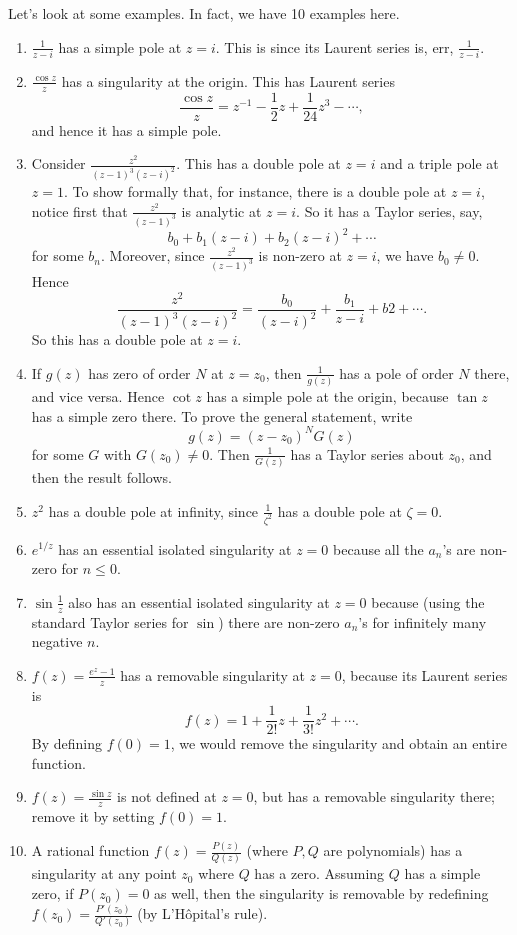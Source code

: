 \documentclass[a4paper]{article}
\begin{document}
Let's look at some examples. In fact, we have 10 examples here.
\begin{eg}\leavevmode
  \begin{enumerate}
    \item $\frac{1}{z - i}$ has a simple pole at $z = i$. This is since its Laurent series is, err, $\frac{1}{z - i}$.
    \item $\frac{\cos z}{z}$ has a singularity at the origin. This has Laurent series
      \[
        \frac{\cos z}{z} = z^{-1} - \frac{1}{2}z + \frac{1}{24}z^3 - \cdots,
      \]
      and hence it has a simple pole.
    \item Consider $\frac{z^2}{(z - 1)^3(z - i)^2}$. This has a double pole at $z = i$ and a triple pole at $z = 1$. To show formally that, for instance, there is a double pole at $z = i$, notice first that $\frac{z^2}{(z - 1)^3}$ is analytic at $z = i$. So it has a Taylor series, say,
      \[
        b_0 + b_1(z - i) + b_2(z - i)^2 + \cdots
      \]
      for some $b_n$. Moreover, since $\frac{z^2}{(z - 1)^3}$ is non-zero at $z = i$, we have $b_0 \not= 0$. Hence
      \[
        \frac{z^2}{(z - 1)^3 (z - i)^2} = \frac{b_0}{(z - i)^2} + \frac{b_1}{z - i} + b2 + \cdots.
      \]
      So this has a double pole at $z = i$.
    \item If $g(z)$ has zero of order $N$ at $z = z_0$, then $\frac{1}{g(z)}$ has a pole of order $N$ there, and vice versa. Hence $\cot z$ has a simple pole at the origin, because $\tan z$ has a simple zero there. To prove the general statement, write
      \[
        g(z) = (z - z_0)^N G(z)
      \]
      for some $G$ with $G(z_0) \not= 0$. Then $\frac{1}{G(z)}$ has a Taylor series about $z_0$, and then the result follows.
    \item $z^2$ has a double pole at infinity, since $\frac{1}{\zeta^2}$ has a double pole at $\zeta = 0$.
    \item $e^{1/z}$ has an essential isolated singularity at $z = 0$ because all the $a_n$'s are non-zero for $n \leq 0$.
    \item $\sin \frac{1}{z}$ also has an essential isolated singularity at $z = 0$ because (using the standard Taylor series for $\sin$) there are non-zero $a_n$'s for infinitely many negative $n$.
    \item $f(z) = \frac{e^z - 1}{z}$ has a removable singularity at $z = 0$, because its Laurent series is
      \[
        f(z) = 1 + \frac{1}{2!}z + \frac{1}{3!}z^2 + \cdots.
      \]
      By defining $f(0) = 1$, we would remove the singularity and obtain an entire function.
    \item $f(z) = \frac{\sin z}{z}$ is not defined at $z = 0$, but has a removable singularity there; remove it by setting $f(0) = 1$.
    \item A rational function $f(z) = \frac{P(z)}{Q(z)}$ (where $P, Q$ are polynomials) has a singularity at any point $z_0$ where $Q$ has a zero. Assuming $Q$ has a simple zero, if $P(z_0) = 0$ as well, then the singularity is removable by redefining $f(z_0) = \frac{P'(z_0)}{Q'(z_0)}$ (by L'H\^opital's rule).
  \end{enumerate}
\end{eg}
\end{document}
